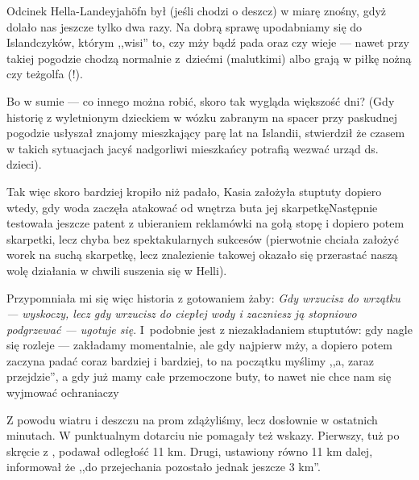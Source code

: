

Odcinek Hella-Landeyjahöfn był (jeśli chodzi o deszcz) w miarę znośny, gdyż dolało nas jeszcze tylko dwa razy. Na dobrą sprawę upodabniamy się do Islandczyków, którym ,,wisi'' to, czy mży bądź pada oraz czy wieje --- nawet przy takiej pogodzie chodzą normalnie z~dziećmi (malutkimi) albo grają w piłkę nożną czy też\textellipsis golfa (!).

Bo w sumie --- co innego można robić, skoro tak wygląda większość dni? (Gdy historię z wyletnionym dzieckiem w wózku zabranym na spacer przy paskudnej pogodzie usłyszał znajomy mieszkający parę lat na Islandii, stwierdził że czasem w takich sytuacjach jacyś nadgorliwi mieszkańcy potrafią wezwać urząd ds. dzieci).

Tak więc skoro bardziej kropiło niż padało, Kasia założyła stuptuty dopiero wtedy, gdy woda zaczęła atakować od wnętrza buta jej skarpetkę\textellipsis Następnie testowała jeszcze patent z ubieraniem reklamówki na gołą stopę i dopiero potem skarpetki, lecz chyba bez spektakularnych sukcesów (pierwotnie chciała założyć worek na suchą skarpetkę, lecz znalezienie takowej okazało się przerastać naszą wolę działania w chwili suszenia się w Helli).

Przypomniała mi się więc historia z gotowaniem żaby: \emph{Gdy wrzucisz do wrzątku --- wyskoczy, lecz gdy wrzucisz do ciepłej wody i zaczniesz ją stopniowo podgrzewać --- ugotuje się}. I~podobnie jest z niezakładaniem stuptutów: gdy nagle się rozleje --- zakładamy momentalnie, ale gdy najpierw mży, a dopiero potem zaczyna padać coraz bardziej i bardziej, to na początku myślimy ,,a, zaraz przejdzie'', a gdy już mamy całe przemoczone buty, to nawet nie chce nam się wyjmować ochraniaczy\textellipsis

Z powodu wiatru i deszczu na prom zdążyliśmy, lecz dosłownie w ostatnich minutach. W punktualnym dotarciu nie pomagały też wskazy. Pierwszy, tuż po skręcie z , podawał odległość 11 km. Drugi, ustawiony równo 11 km dalej, informował że ,,do przejechania pozostało jednak jeszcze 3 km''.

